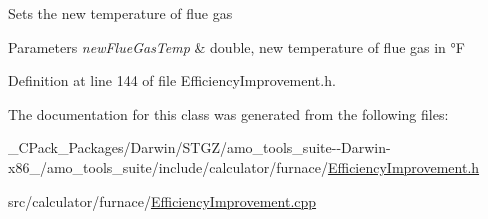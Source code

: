Sets the new temperature of flue gas


\begin{DoxyParams}{Parameters}
{\em new\+Flue\+Gas\+Temp} & double, new temperature of flue gas in °F \\
\hline
\end{DoxyParams}


Definition at line 144 of file Efficiency\+Improvement.\+h.



The documentation for this class was generated from the following files\+:\begin{DoxyCompactItemize}
\item 
\+\_\+\+C\+Pack\+\_\+\+Packages/\+Darwin/\+S\+T\+G\+Z/amo\+\_\+tools\+\_\+suite-\/-\/\+Darwin-\/x86\+\_/amo\+\_\+tools\+\_\+suite/include/calculator/furnace/\hyperlink{___c_pack___packages_2_darwin_2_s_t_g_z_2amo__tools__suite--_darwin-x86__64_2amo__tools__suite_26e7520aa6e88764b15ca5320d25b7632}{Efficiency\+Improvement.\+h}\item 
src/calculator/furnace/\hyperlink{_efficiency_improvement_8cpp}{Efficiency\+Improvement.\+cpp}\end{DoxyCompactItemize}
